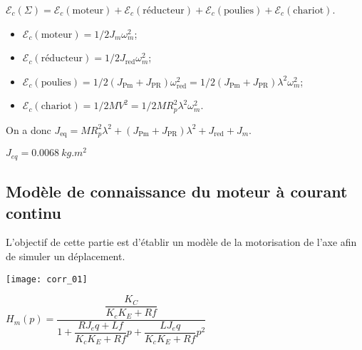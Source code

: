 \ifprof
\begin{corrige}
$\mathcal{E}_c(\Sigma)=\mathcal{E}_c (\text{moteur})+\mathcal{E}_c (\text{réducteur})+\mathcal{E}_c (\text{poulies})+\mathcal{E}_c (\text{chariot})$.
\begin{itemize}
	\item $\mathcal{E}_c (\text{moteur})=1/2 J_m \omega_m^2$;
	\item $\mathcal{E}_c (\text{réducteur})=1/2 J_{\text{red}} \omega_m^2$;
	\item $\mathcal{E}_c (\text{poulies})=1/2 (J_{\text{Pm}}+J_{\text{PR}}  ) \omega_{\text{red}}^2=1/2 (J_{\text{Pm}}+J_{\text{PR}}  ) \lambda^2 \omega_m^2$;
	\item $\mathcal{E}_c (\text{chariot})=1/2 MV^2=1/2 MR_p^2 \lambda^2 \omega_m^2$.
\end{itemize}
On a donc $J_{\text{eq}}=MR_p^2 \lambda^2+(J_{\text{Pm}}+J_{\text{PR}}  ) \lambda^2+J_{\text{red}}+J_m$.

\end{corrige}
\else
\fi

\ifprof
\begin{corrige}
$J_{eq}=\SI{0,0068}{kg.m^2}$
\end{corrige}
\else
\fi

\subsection*{Modèle de connaissance du moteur à courant continu}

\begin{obj}
L'objectif de cette partie est d'établir un modèle de la motorisation de l'axe afin de simuler un déplacement.
\end{obj}

\ifprof
\begin{corrige} 

\begin{center}
\texttt{[image: corr\_01]}
\end{center} 
\end{corrige}
\else
\fi
{}
\ifprof
\begin{corrige}
$H_m (p)=\dfrac{\dfrac{K_C}{K_c K_E+Rf}}{1+\dfrac{RJ_eq+Lf}{K_c K_E+Rf}p+\dfrac{LJ_eq}{K_c K_E+Rf} p^2}$
\end{corrige}
\else
\fi

